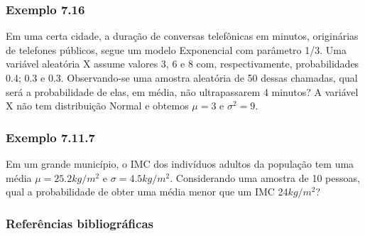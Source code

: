 \documentclass[11pt]{beamer}
\begin{document}
\begin{frame}
\frametitle{Exemplo 7.16}
Em uma certa cidade, a duração de conversas telefônicas em minutos, originárias de telefones públicos, segue um modelo Exponencial com parâmetro 1/3. 
Uma variável aleatória X assume valores 3, 6 e 8 com, respectivamente, probabilidades 0.4; 0.3 e 0.3. Observando-se uma amostra aleatória de 50 dessas chamadas, qual será a probabilidade de elas, em média, não ultrapassarem 4 minutos? A variável X não tem distribuição Normal e obtemos \(\mu=3\) e \(\sigma^2=9\).
\vspace{1in}
\vspace{1in}

\end{frame}

\begin{frame}
\frametitle{Exemplo 7.11.7}
Em um grande município, o IMC dos indivíduos adultos da população tem uma média \(\mu=25.2kg/m^2\) e \(\sigma=4.5kg/m^2\). Considerando uma amostra de 10 pessoas, qual a probabilidade de obter uma média menor que um IMC 24\(kg/m^2\)?
\vspace{1in}
\vspace{1in}

\end{frame}


\begin{frame}
\frametitle{Referências bibliográficas}
\printbibliography
\end{frame}
\end{document}
